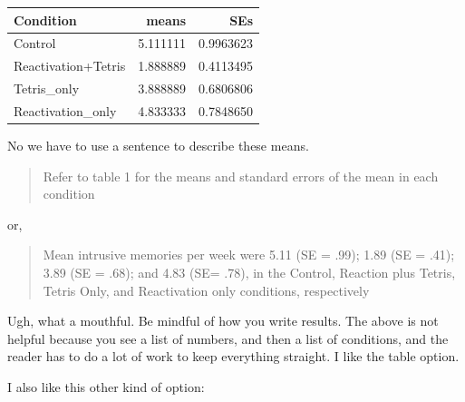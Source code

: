\documentclass[]{book}
\newenvironment{Shaded}{\begin{snugshade}}{\end{snugshade}}
\newcommand{\KeywordTok}[1]{\textcolor[rgb]{0.13,0.29,0.53}{\textbf{{#1}}}}
\newcommand{\DataTypeTok}[1]{\textcolor[rgb]{0.13,0.29,0.53}{{#1}}}
\newcommand{\StringTok}[1]{\textcolor[rgb]{0.31,0.60,0.02}{{#1}}}
\newcommand{\CommentTok}[1]{\textcolor[rgb]{0.56,0.35,0.01}{\textit{{#1}}}}
\newcommand{\NormalTok}[1]{{#1}}
\theoremstyle{definition}
\theoremstyle{definition}
\theoremstyle{definition}
\theoremstyle{remark}
\begin{document}
\begin{Shaded}
\end{Shaded}

\begin{tabular}{l|r|r}
\hline
Condition & means & SEs\\
\hline
Control & 5.111111 & 0.9963623\\
\hline
Reactivation+Tetris & 1.888889 & 0.4113495\\
\hline
Tetris\_only & 3.888889 & 0.6806806\\
\hline
Reactivation\_only & 4.833333 & 0.7848650\\
\hline
\end{tabular}

No we have to use a sentence to describe these means.

\begin{quote}
Refer to table 1 for the means and standard errors of the mean in each
condition
\end{quote}

or,

\begin{quote}
Mean intrusive memories per week were 5.11 (SE = .99); 1.89 (SE = .41);
3.89 (SE = .68); and 4.83 (SE= .78), in the Control, Reaction plus
Tetris, Tetris Only, and Reactivation only conditions, respectively
\end{quote}

Ugh, what a mouthful. Be mindful of how you write results. The above is
not helpful because you see a list of numbers, and then a list of
conditions, and the reader has to do a lot of work to keep everything
straight. I like the table option.

I also like this other kind of option:
\end{document}
